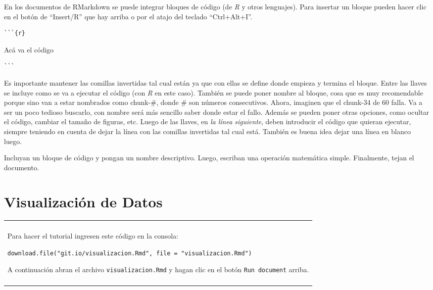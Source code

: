 \documentclass[]{book}
\newenvironment{Shaded}{\begin{snugshade}}{\end{snugshade}}
\newcommand{\NormalTok}[1]{#1}
\newenvironment{atencion}
    {\begin{center}
    \begin{tabular}{|p{0.9\textwidth}|}
    \hline\\
    }
    { 
    \\\\\hline
    \end{tabular} 
    \end{center}
    }
\theoremstyle{definition}
\theoremstyle{definition}
\theoremstyle{definition}
\theoremstyle{remark}
\let\BeginKnitrBlock\begin \let\EndKnitrBlock\end
\begin{document}
En los documentos de RMarkdown se puede integrar bloques de código (de
\emph{R} y otros lenguajes). Para insertar un bloque pueden hacer clic
en el botón de ``Insert/R'' que hay arriba o por el atajo del teclado
``Ctrl+Alt+I''.

\begin{verbatim}
```{r}
\end{verbatim}

\begin{Shaded}
\begin{Highlighting}[]
\NormalTok{Acá va el código}
\end{Highlighting}
\end{Shaded}

\begin{verbatim}
```
\end{verbatim}

Es importante mantener las comillas invertidas tal cual están ya que con
ellas se define donde empieza y termina el bloque. Entre las llaves se
incluye como se va a ejecutar el código (con \emph{R} en este caso).
También se puede poner nombre al bloque, cosa que es muy recomendable
porque sino van a estar nombrados como chunk-\#, donde \# son números
consecutivos. Ahora, imaginen que el chunk-34 de 60 falla. Va a ser un
poco tedioso buscarlo, con nombre será más sencillo saber donde estar el
fallo. Además se pueden poner otras opciones, como ocultar el código,
cambiar el tamaño de figuras, etc. Luego de las llaves, en \emph{la
línea siguiente}, deben introducir el código que quieran ejecutar,
siempre teniendo en cuenta de dejar la línea con las comillas invertidas
tal cual está. También es buena idea dejar una línea en blanco luego.

\BeginKnitrBlock{exercise}
\protect\hypertarget{exr:ejercicio-3}{}{\label{exr:ejercicio-3} }Incluyan un
bloque de código y pongan un nombre descriptivo. Luego, escriban una
operación matemática simple. Finalmente, tejan el documento.
\EndKnitrBlock{exercise}

\hypertarget{visualizacion-de-datos}{%
\chapter{Visualización de Datos}\label{visualizacion-de-datos}}

\begin{atencion}
Para hacer el tutorial ingresen este código en la consola:

\texttt{download.file("git.io/visualizacion.Rmd",\ file\ =\ "visualizacion.Rmd")}

A continuación abran el archivo \texttt{visualizacion.Rmd} y hagan clic
en el botón \texttt{Run\ document} arriba.
\end{atencion}
\end{document}
